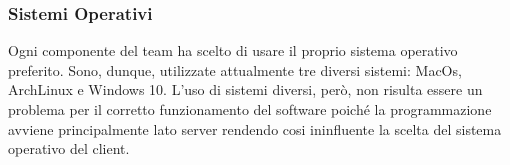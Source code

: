 \subsubsection{Sistemi Operativi}
Ogni componente del team ha scelto di usare il proprio sistema operativo preferito. Sono, dunque, utilizzate attualmente tre diversi sistemi: MacOs,  ArchLinux e Windows 10. L'uso di sistemi diversi, però, non risulta essere un problema per il corretto funzionamento del software poiché la programmazione avviene principalmente lato server rendendo cosi ininfluente la scelta del sistema operativo del client.

\newpage 